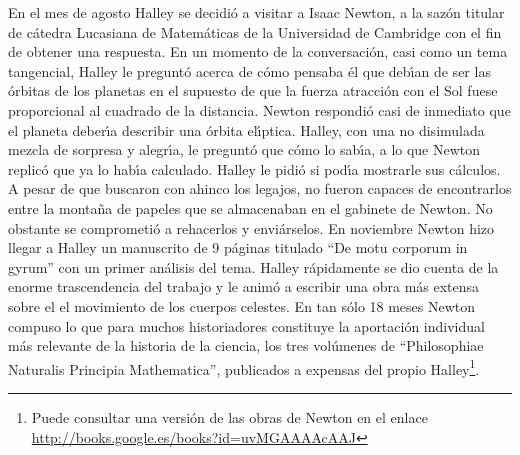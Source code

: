 En el mes de agosto Halley se decidi\'o a visitar a Isaac Newton, a la saz\'on titular de c\'atedra Lucasiana de Matem\'aticas  de la Universidad de Cambridge con el fin de obtener una respuesta. En un momento de la conversaci\'on, casi como un tema tangencial, Halley le pregunt\'o acerca de c\'omo pensaba \'el que deb\'\i{}an de ser las \'orbitas de los planetas en el supuesto de que la fuerza atracci\'on con el Sol fuese proporcional al cuadrado de la distancia. Newton respondi\'o casi de inmediato que el planeta deber\'\i{}a describir una \'orbita el\'\i{}ptica. Halley, con una no disimulada mezcla de sorpresa y alegr\'\i{}a, le pregunt\'o que c\'omo lo sab\'\i{}a, a lo que Newton replic\'o que ya lo hab\'\i{}a calculado. Halley le pidi\'o si pod\'\i{}a mostrarle sus c\'alculos. A pesar de que buscaron con ahinco los legajos, no fueron capaces de encontrarlos entre la monta\~{n}a de papeles que se almacenaban en el gabinete de Newton. No obstante se comprometi\'o a rehacerlos y envi\'arselos. En noviembre Newton hizo llegar a Halley un manuscrito de 9 p\'aginas titulado ``De motu corporum in gyrum'' con un primer an\'alisis del tema. Halley r\'apidamente se dio cuenta de la enorme trascendencia del trabajo y le anim\'o a escribir una obra m\'as extensa sobre el el movimiento de los cuerpos celestes. En tan s\'olo 18 meses Newton compuso lo que para muchos historiadores constituye la aportaci\'on individual m\'as relevante de la historia de la ciencia, los tres vol\'umenes de  ``Philosophiae Naturalis Principia Mathematica'', publicados a expensas del propio Halley\footnote{Puede consultar una versi\'on de las obras de Newton en el enlace \url{http://books.google.es/books?id=uvMGAAAAcAAJ}}.



%
%
%
%

